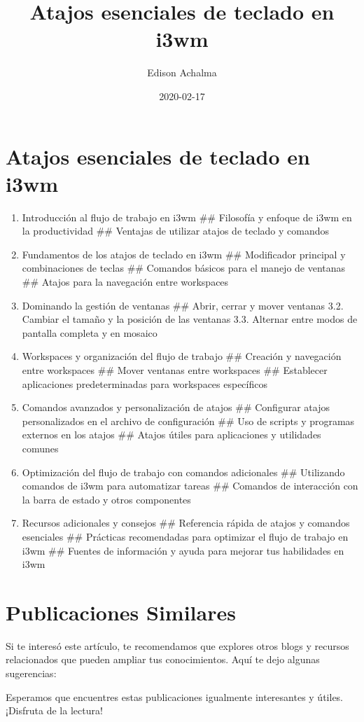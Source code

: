 \documentclass[
  jou,
  floatsintext,
  longtable,
  a4paper,
  nolmodern,
  notxfonts,
  notimes,
  12pt,
  colorlinks=true,linkcolor=blue,citecolor=blue,urlcolor=blue]{apa7}
\title{Atajos esenciales de teclado en i3wm}
\author{Edison Achalma}
\affiliation{
{Escuela Profesional de Economía, Universidad Nacional de San Cristóbal
de Huamanga}}
\date{2020-02-17}
\begin{document}
\maketitle


\hypertarget{toc}{}
\tableofcontents
\newpage
\section[Introduction]{Atajos esenciales de teclado en i3wm}

\setcounter{secnumdepth}{3}

\setlength\LTleft{0pt}




\begin{enumerate}
\def\labelenumi{\arabic{enumi}.}
\item
  Introducción al flujo de trabajo en i3wm \#\# Filosofía y enfoque de
  i3wm en la productividad \#\# Ventajas de utilizar atajos de teclado y
  comandos
\item
  Fundamentos de los atajos de teclado en i3wm \#\# Modificador
  principal y combinaciones de teclas \#\# Comandos básicos para el
  manejo de ventanas \#\# Atajos para la navegación entre workspaces
\item
  Dominando la gestión de ventanas \#\# Abrir, cerrar y mover ventanas
  3.2. Cambiar el tamaño y la posición de las ventanas 3.3. Alternar
  entre modos de pantalla completa y en mosaico
\item
  Workspaces y organización del flujo de trabajo \#\# Creación y
  navegación entre workspaces \#\# Mover ventanas entre workspaces \#\#
  Establecer aplicaciones predeterminadas para workspaces específicos
\item
  Comandos avanzados y personalización de atajos \#\# Configurar atajos
  personalizados en el archivo de configuración \#\# Uso de scripts y
  programas externos en los atajos \#\# Atajos útiles para aplicaciones
  y utilidades comunes
\item
  Optimización del flujo de trabajo con comandos adicionales \#\#
  Utilizando comandos de i3wm para automatizar tareas \#\# Comandos de
  interacción con la barra de estado y otros componentes
\item
  Recursos adicionales y consejos \#\# Referencia rápida de atajos y
  comandos esenciales \#\# Prácticas recomendadas para optimizar el
  flujo de trabajo en i3wm \#\# Fuentes de información y ayuda para
  mejorar tus habilidades en i3wm
\end{enumerate}

\section{Publicaciones Similares}\label{publicaciones-similares}

Si te interesó este artículo, te recomendamos que explores otros blogs y
recursos relacionados que pueden ampliar tus conocimientos. Aquí te dejo
algunas sugerencias:

Esperamos que encuentres estas publicaciones igualmente interesantes y
útiles. ¡Disfruta de la lectura!
\end{document}
